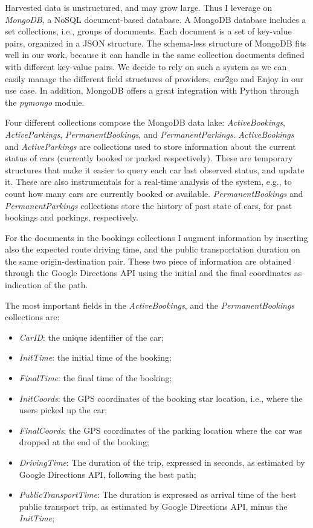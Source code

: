 Harvested data is unstructured, and may grow large. Thus I leverage on \textit{MongoDB}, a NoSQL document-based database. A MongoDB database includes a set collections, i.e., groups of documents. Each document is a set of key-value pairs, organized in a JSON structure. The schema-less structure of MongoDB fits well in our work, because it can handle in the same collection documents defined with different key-value pairs. We decide to rely on such a system as we can easily manage the different field structures of providers, car2go and Enjoy in our use case. In addition, MongoDB offers a great integration with Python through the \textit{pymongo} module.

Four different collections compose the MongoDB data lake:  \textit{ActiveBookings}, \textit{ActiveParkings}, \textit{PermanentBookings}, and \textit{PermanentParkings}. 
\textit{ActiveBookings} and \textit{ActiveParkings} are collections used to store information about the current status of cars (currently booked or parked respectively). These are temporary structures that make it easier to query each car last observed status, and update it. These are also instrumentals for a real-time analysis of the system, e.g., to count how many cars are currently booked or available.
\textit{PermanentBookings} and \textit{PermanentParkings} collections store the history of past state of cars, for past bookings and parkings, respectively.

For the documents in the bookings collections I augment information by inserting also the expected route driving time, and the public transportation duration on the same origin-destination pair. These two piece of information are obtained through the Google Directions API using the initial and the final coordinates as indication of the path.

The most important fields in the \textit{ActiveBookings}, and the \textit{PermanentBookings} collections are:
\begin{itemize}
\setlength\itemsep{0.1em}
\item \textit{CarID}: the unique identifier of the car;
\item \textit{InitTime}: the initial time of the booking;
\item \textit{FinalTime}:  the final time of the booking;
\item \textit{InitCoords}:  the GPS coordinates of the booking star location, i.e., where the users picked up the car;
\item \textit{FinalCoords}:  the GPS coordinates of the parking location where the car was dropped at the end of the booking;
\item \textit{DrivingTime}: The duration of the trip, expressed in seconds, as estimated by Google Directions API, following the best path;
\item \textit{PublicTransportTime}: The duration is expressed as arrival time of the best public transport trip, as estimated by Google Directions API, minus the \textit{InitTime};
\end{itemize}

